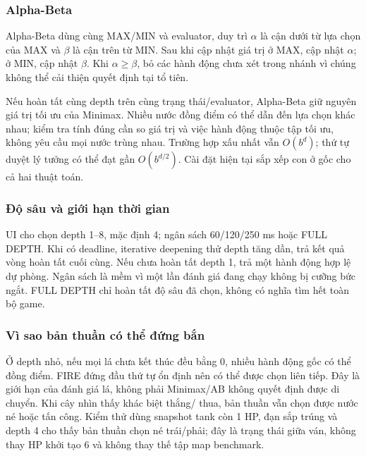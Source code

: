 \subsubsection{Alpha-Beta}
Alpha-Beta dùng cùng MAX/MIN và evaluator, duy trì $\alpha$ là cận
dưới từ lựa chọn của MAX và $\beta$ là cận trên từ MIN. Sau khi cập
nhật giá trị ở MAX, cập nhật $\alpha$; ở MIN, cập nhật $\beta$. Khi
$\alpha\geq\beta$, bỏ các hành động chưa xét trong nhánh vì chúng
không thể cải thiện quyết định tại tổ tiên.

Nếu hoàn tất cùng depth trên cùng trạng thái/evaluator, Alpha-Beta
giữ nguyên giá trị tối ưu của Minimax. Nhiều nước đồng điểm có thể
dẫn đến lựa chọn khác nhau; kiểm tra tính đúng cần so giá trị và việc
hành động thuộc tập tối ưu, không yêu cầu mọi nước trùng nhau. Trường
hợp xấu nhất vẫn $O(b^d)$; thứ tự duyệt lý tưởng có thể đạt gần
$O(b^{d/2})$. Cài đặt hiện tại sắp xếp con ở gốc cho cả hai thuật toán.

\subsubsection{Độ sâu và giới hạn thời gian}
UI cho chọn depth 1--8, mặc định 4; ngân sách 60/120/250 ms hoặc
FULL DEPTH. Khi có deadline, iterative deepening thử depth tăng dần,
trả kết quả vòng hoàn tất cuối cùng. Nếu chưa hoàn tất depth 1, trả
một hành động hợp lệ dự phòng. Ngân sách là mềm vì một lần đánh giá
đang chạy không bị cưỡng bức ngắt. FULL DEPTH chỉ hoàn tất độ sâu đã
chọn, không có nghĩa tìm hết toàn bộ game.

\subsubsection{Vì sao bản thuần có thể đứng bắn}
Ở depth nhỏ, nếu mọi lá chưa kết thúc đều bằng 0, nhiều hành động gốc
có thể đồng điểm. FIRE đứng đầu thứ tự ổn định nên có thể được chọn
liên tiếp. Đây là giới hạn của đánh giá lá, không phải Minimax/AB
không quyết định được di chuyển. Khi cây nhìn thấy khác biệt thắng/
thua, bản thuần vẫn chọn được nước né hoặc tấn công. Kiểm thử dùng
snapshot tank còn 1 HP, đạn sắp trúng và depth 4 cho thấy bản thuần
chọn né trái/phải; đây là trạng thái giữa ván, không thay HP khởi tạo 6
và không thay thế tập map benchmark.

